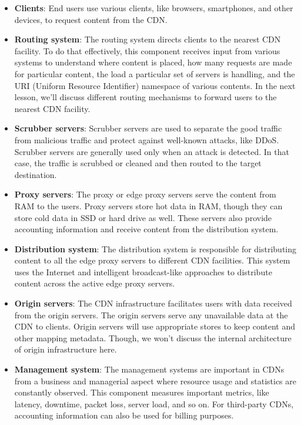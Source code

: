 \begin{itemize}
\item
\protect{}\label{6zTS9TpzgelKH-7kHE8Yr}
\textbf{Clients}: End users use various clients, like browsers, smartphones, and other devices, to request content from the CDN.
\item
\protect{}\label{2k4ua4qWy8FbOcYKsvydG}
\textbf{Routing system}: The routing system directs clients to the nearest CDN facility. To do that effectively, this component receives input from various systems to understand where content is placed, how many requests are made for particular content, the load a particular set of servers is handling, and the URI (Uniform Resource Identifier) namespace of various contents. In the next lesson, we'll discuss different routing mechanisms to forward users to the nearest CDN facility.
\item
\protect{}\label{JEdlxtwBDNqrakP0wK7Xp}
\textbf{Scrubber servers}: Scrubber servers are used to separate the good traffic from malicious traffic and protect against well-known attacks, like DDoS. Scrubber servers are generally used only when an attack is detected. In that case, the traffic is scrubbed or cleaned and then routed to the target destination.
\item
\protect{}\label{Sk3uyUCcv-6oatRzp2EPl}
\textbf{Proxy servers}: The proxy or edge proxy servers serve the content from RAM to the users. Proxy servers store hot data in RAM, though they can store cold data in SSD or hard drive as well. These servers also provide accounting information and receive content from the distribution system.
\item
\protect{}\label{X8hHnJQMUYc2FmwqRxOim}
\textbf{Distribution system}: The distribution system is responsible for distributing content to all the edge proxy servers to different CDN facilities. This system uses the Internet and intelligent broadcast-like approaches to distribute content across the active edge proxy servers.
\item
\protect{}\label{f-fobCj0CB6uVvUAyR0FW}
\textbf{Origin servers}: The CDN infrastructure facilitates users with data received from the origin servers. The origin servers serve any unavailable data at the CDN to clients. Origin servers will use appropriate stores to keep content and other mapping metadata. Though, we won't discuss the internal architecture of origin infrastructure here.
\item
\protect{}\label{V6ZIUMOBwe4q2N-lV1cCw}
\textbf{Management system}: The management systems are important in CDNs from a business and managerial aspect where resource usage and statistics are constantly observed. This component measures important metrics, like latency, downtime, packet loss, server load, and so on. For third-party CDNs, accounting information can also be used for billing purposes.
\end{itemize}

